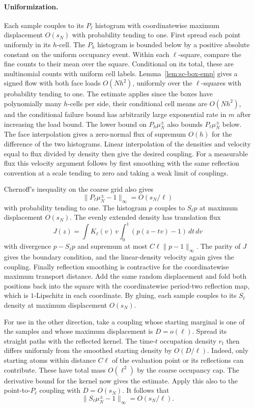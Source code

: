\documentclass[11pt]{article}
\newcommand{\1}{\mathbf{1}}
\numberwithin{equation}{section}
\begin{document}
\paragraph{Uniformization.}
Each sample couples to its \(P_\ell\) histogram with
coordinatewise maximum displacement \(O(s_N)\) with probability
tending to one. First spread each point uniformly in its
\(h\)-cell. The \(P_h\) histogram is bounded below by a positive
absolute constant on the uniform occupancy event. Within each
\(\ell\)-square, compare the fine counts to their mean over the
square. Conditional on its total, these are multinomial counts
with uniform cell labels. Lemma~\ref{lem:sc-box-emp} gives
a signed flow with both face loads \(O(Nh^2)\), uniformly over
the \(\ell\)-squares with probability tending to one.
The estimate applies since the boxes have polynomially many
\(h\)-cells per side, their conditional cell means are
\(O(Nh^2)\), and the conditional failure bound has arbitrarily
large exponential rate in \(m\) after increasing the load bound.
The lower bound on \(P_h\mu_N^\pm\) also bounds
\(P_\ell\mu_N^\pm\) below. The face interpolation gives a
zero-normal flux of supremum \(O(h)\) for the difference of the
two histograms. Linear interpolation of the densities and
velocity equal to flux divided by density then give the desired
coupling. For a measurable flux this velocity argument follows
by first smoothing with the same reflection convention at a
scale tending to zero and taking a weak limit of couplings.

Chernoff's inequality on the coarse grid also gives
\[
 \|P_\ell\mu_N^\pm-1\|_\infty=O(s_N/\ell)
\]
with probability tending to one. The histogram \(p\) couples
to \(S_\ell p\) at maximum displacement \(O(s_N)\). The
evenly extended density has translation flux
\[
 J(z)=\int K_\ell(v)\,v
                 \int_0^1(p(z-tv)-1)\,dt\,dv
\]
with divergence \(p-S_\ell p\) and supremum at most
\(C\ell\|p-1\|_\infty\). The parity of \(J\) gives the
boundary condition, and the linear-density velocity again
gives the coupling. Finally reflection smoothing is
contractive for the coordinatewise maximum transport distance.
Add the same random displacement and fold both positions
back into the square with the coordinatewise period-two
reflection map, which is \(1\)-Lipschitz in each coordinate.
By gluing, each sample couples to its \(S_\ell\) density at
maximum displacement \(O(s_N)\).

For use in the other direction, take a coupling whose starting
marginal is one of the samples and whose maximum displacement is
\(D=o(\ell)\). Spread its straight paths with the reflected
kernel. The time-\(t\) occupation density \(r_t\) then differs
uniformly from the smoothed starting density by \(O(D/\ell)\).
Indeed, only starting atoms within distance \(C\ell\) of the
evaluation point or its reflections can contribute. These
have total mass \(O(\ell^2)\) by the coarse occupancy cap.
The derivative bound for the kernel now gives the estimate.
Apply this also to the point-to-\(P_\ell\) coupling with
\(D=O(s_N)\). It follows that
\begin{equation}\label{eq:smooth-densities}
 \|S_\ell\mu_N^\pm-1\|_\infty=O(s_N/\ell).
\end{equation}
\end{document}
